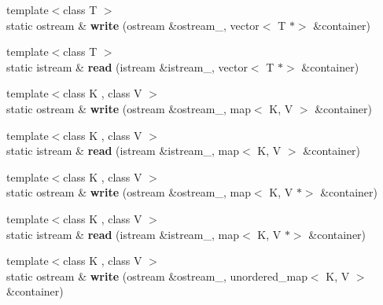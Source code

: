 \begin{DoxyCompactItemize}
\item 
\mbox{\label{classserialize_adb3cc636ff02dcf157ed343d5d680297}} 
{\footnotesize template$<$class T $>$ }\\static ostream \& {\bfseries write} (ostream \&ostream\+\_\+, vector$<$ T $\ast$$>$ \&container)
\item 
\mbox{\label{classserialize_a11bcb1e62b0fd391ccb028ddbc7d5f1c}} 
{\footnotesize template$<$class T $>$ }\\static istream \& {\bfseries read} (istream \&istream\+\_\+, vector$<$ T $\ast$$>$ \&container)
\item 
\mbox{\label{classserialize_ae216738aa56130ca850f9a9ef2ef0f50}} 
{\footnotesize template$<$class K , class V $>$ }\\static ostream \& {\bfseries write} (ostream \&ostream\+\_\+, map$<$ K, V $>$ \&container)
\item 
\mbox{\label{classserialize_a552182305ba9cc5225366c7efdbcc234}} 
{\footnotesize template$<$class K , class V $>$ }\\static istream \& {\bfseries read} (istream \&istream\+\_\+, map$<$ K, V $>$ \&container)
\item 
\mbox{\label{classserialize_afa31b4e86afe0002929ad60882f0da05}} 
{\footnotesize template$<$class K , class V $>$ }\\static ostream \& {\bfseries write} (ostream \&ostream\+\_\+, map$<$ K, V $\ast$$>$ \&container)
\item 
\mbox{\label{classserialize_a5f22cd59cd7b7aec597ec19d882a370f}} 
{\footnotesize template$<$class K , class V $>$ }\\static istream \& {\bfseries read} (istream \&istream\+\_\+, map$<$ K, V $\ast$$>$ \&container)
\item 
\mbox{\label{classserialize_af8a42854f5c3bf6cd650bababc7373ce}} 
{\footnotesize template$<$class K , class V $>$ }\\static ostream \& {\bfseries write} (ostream \&ostream\+\_\+, unordered\+\_\+map$<$ K, V $>$ \&container)
\item 
\mbox{\label{classserialize_a45c50a563b95f2eb500c77f1d35fdbbd}} 

\end{DoxyCompactItemize}
